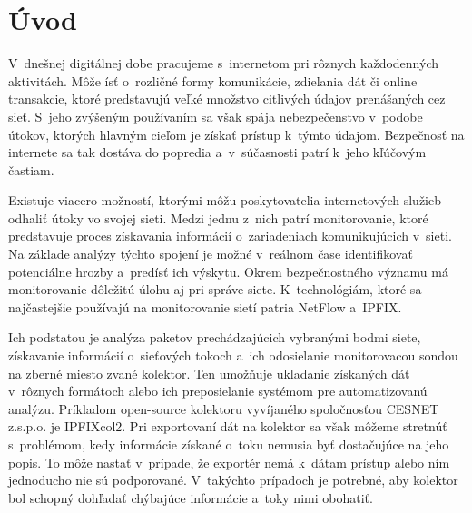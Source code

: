 %


\chapter{Úvod}

V~dnešnej digitálnej dobe pracujeme s~internetom pri rôznych každodenných aktivitách. Môže ísť o~rozličné formy komunikácie, zdieľania dát či online transakcie, ktoré predstavujú veľké množstvo citlivých údajov prenášaných cez sieť.
S~jeho zvýšeným používaním sa však spája nebezpečenstvo v~podobe útokov, ktorých hlavným cieľom je získať prístup k~týmto údajom. Bezpečnosť na internete sa tak dostáva do popredia a~v~súčasnosti patrí k~jeho kľúčovým častiam.

Existuje viacero možností, ktorými môžu poskytovatelia internetových služieb odhaliť útoky vo svojej sieti. Medzi jednu z~nich patrí monitorovanie, ktoré predstavuje proces získavania informácií o~zariadeniach komunikujúcich v~sieti.
Na základe analýzy týchto spojení je možné v~reálnom čase identifikovať potenciálne hrozby a~predísť ich výskytu. Okrem bezpečnostného významu má monitorovanie dôležitú úlohu aj pri správe siete. K~technológiám, ktoré sa
najčastejšie používajú na monitorovanie sietí patria NetFlow a~IPFIX.


Ich podstatou je analýza paketov prechádzajúcich vybranými bodmi siete, získavanie informácií o~sieťových tokoch a~ich odosielanie monitorovacou sondou na zberné miesto zvané kolektor. Ten umožňuje ukladanie získaných dát v~rôznych formátoch alebo ich preposielanie
systémom pre automatizovanú analýzu. Príkladom open-source kolektoru vyvíjaného spoločnosťou CESNET z.s.p.o. je IPFIXcol2.
Pri exportovaní dát na kolektor sa však môžeme stretnúť s~problémom, kedy informácie získané o~toku nemusia byť dostačujúce na jeho popis. To môže nastať v~prípade, že exportér nemá k~dátam prístup alebo ním jednoducho nie sú podporované.
V~takýchto prípadoch je potrebné, aby kolektor bol schopný dohľadať chýbajúce informácie a~toky nimi obohatiť.

